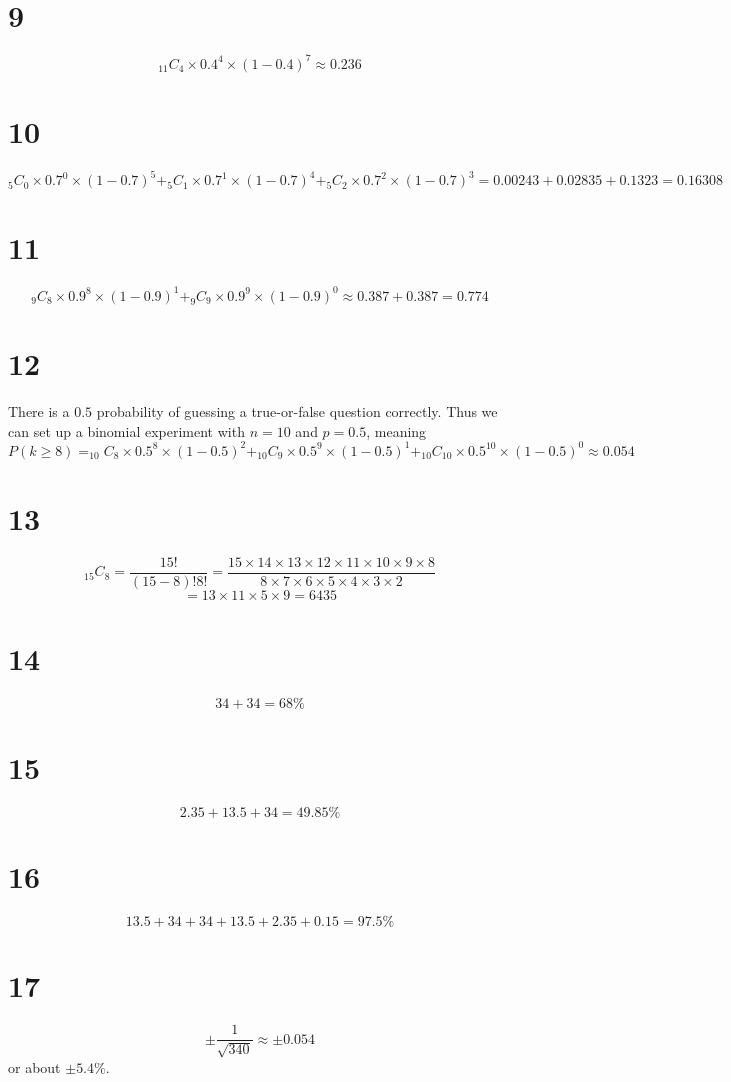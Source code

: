 \documentclass{article}
\theoremstyle{definition}
\newcommand{\?}{\stackrel{?}{=}}
\begin{document}
\section*{9}
\[ _{11}C_4\times 0.4^4\times (1-0.4)^7\approx 0.236 \]

\section*{10}
\[ _5C_0\times 0.7^0\times (1-0.7)^5+_5C_1\times 0.7^1\times (1-0.7)^4+_5C_2\times 0.7^2\times (1-0.7)^3=0.00243+0.02835+0.1323=0.16308 \]

\section*{11}
\[ _9C_8\times 0.9^8\times (1-0.9)^1+_9C_9\times 0.9^9\times (1-0.9)^0\approx 0.387+0.387=0.774 \]

\section*{12}
There is a $0.5$ probability of guessing a true-or-false question correctly. Thus we can set up a binomial experiment with $n=10$ and $p=0.5$, meaning
\[ P(k\ge 8)=_{10}C_8\times 0.5^8\times (1-0.5)^2+_{10}C_9\times 0.5^9\times (1-0.5)^1+_{10}C_{10}\times 0.5^{10}\times (1-0.5)^0\approx 0.054 \]

\section*{13}
\[ _{15}C_8=\frac{15!}{(15-8)!8!}=\frac{15\times 14\times 13\times 12\times 11\times 10\times 9\times 8}{8\times 7\times 6\times 5\times 4\times 3\times 2} \]
\[ =13\times 11\times 5\times 9=6435 \]

\section*{14}
\[ 34+34=68\% \]

\section*{15}
\[ 2.35+13.5+34=49.85\% \]

\section*{16}
\[ 13.5+34+34+13.5+2.35+0.15=97.5\% \]

\section*{17}
\[ \pm\frac{1}{\sqrt{340}}\approx \pm 0.054 \] or about $\pm 5.4\%$.
\end{document}
